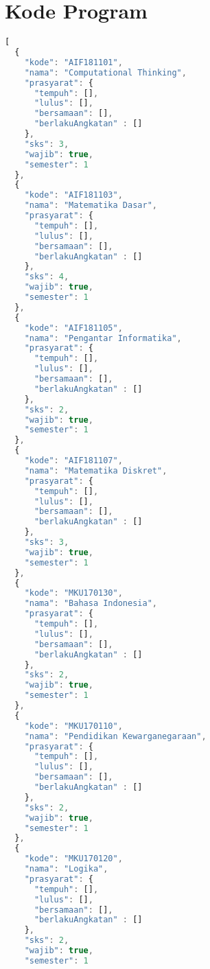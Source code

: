 \chapter{Kode Program}
\label{lamp:B}

%
%
%

\begin{lstlisting}[language=Javascript, caption=prasyarat.json]
[
  {
    "kode": "AIF181101",
    "nama": "Computational Thinking",
    "prasyarat": {
      "tempuh": [],
      "lulus": [],
      "bersamaan": [],
      "berlakuAngkatan" : []
    },
    "sks": 3,
    "wajib": true,
    "semester": 1
  },
  {
    "kode": "AIF181103",
    "nama": "Matematika Dasar",
    "prasyarat": {
      "tempuh": [],
      "lulus": [],
      "bersamaan": [],
      "berlakuAngkatan" : []
    },
    "sks": 4,
    "wajib": true,
    "semester": 1
  },
  {
    "kode": "AIF181105",
    "nama": "Pengantar Informatika",
    "prasyarat": {
      "tempuh": [],
      "lulus": [],
      "bersamaan": [],
      "berlakuAngkatan" : []
    },
    "sks": 2,
    "wajib": true,
    "semester": 1
  },
  {
    "kode": "AIF181107",
    "nama": "Matematika Diskret",
    "prasyarat": {
      "tempuh": [],
      "lulus": [],
      "bersamaan": [],
      "berlakuAngkatan" : []
    },
    "sks": 3,
    "wajib": true,
    "semester": 1
  },
  {
    "kode": "MKU170130",
    "nama": "Bahasa Indonesia",
    "prasyarat": {
      "tempuh": [],
      "lulus": [],
      "bersamaan": [],
      "berlakuAngkatan" : []
    },
    "sks": 2,
    "wajib": true,
    "semester": 1
  },
  {
    "kode": "MKU170110",
    "nama": "Pendidikan Kewarganegaraan",
    "prasyarat": {
      "tempuh": [],
      "lulus": [],
      "bersamaan": [],
      "berlakuAngkatan" : []
    },
    "sks": 2,
    "wajib": true,
    "semester": 1
  },
  {
    "kode": "MKU170120",
    "nama": "Logika",
    "prasyarat": {
      "tempuh": [],
      "lulus": [],
      "bersamaan": [],
      "berlakuAngkatan" : []
    },
    "sks": 2,
    "wajib": true,
    "semester": 1

\end{lstlisting}

